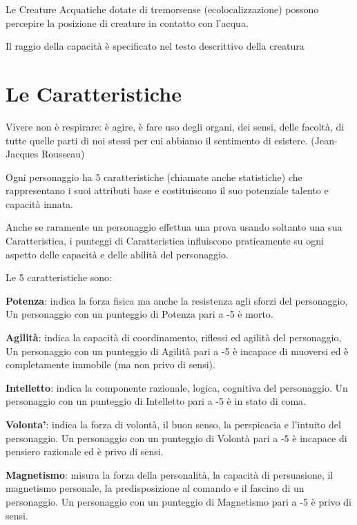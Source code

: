 \documentclass[a4paper,11pt,twoside,openany]{book}
\begin{document}
Le Creature Acquatiche dotate di tremorsense (ecolocalizzazione) possono percepire la posizione di creature in contatto con l’acqua.

Il raggio della capacità è specificato nel testo descrittivo della creatura

\pagebreak

\section{Le Caratteristiche}

\label{le-caratteristiche}

\begin{tcolorbox}[enhanced,arc=5pt,boxrule=0.3pt]{Vivere non è respirare: è agire, è fare uso degli organi, dei sensi, delle facoltà, di tutte quelle parti di noi stessi per cui abbiamo il sentimento di esistere. (Jean-Jacques Rousseau)}\end{tcolorbox}\medskip

Ogni personaggio ha 5 caratteristiche (chiamate anche statistiche) che rappresentano i suoi attributi base e costituiscono il suo potenziale talento e capacità innata.

Anche se raramente un personaggio effettua una prova usando soltanto una sua Caratteristica, i punteggi di Caratteristica influiscono praticamente su ogni aspetto delle capacità e delle abilità del personaggio.

Le 5 caratteristiche sono:

\textbf{Potenza}: indica la forza fisica ma anche la resistenza agli sforzi del personaggio, Un personaggio con un punteggio di Potenza pari a -5 è morto.

\textbf{Agilità}: indica la capacità di coordinamento, riflessi ed agilità del personaggio, Un personaggio con un punteggio di Agilità pari a -5 è incapace di muoversi ed è completamente immobile (ma non privo di sensi).

\textbf{Intelletto}: indica la componente razionale, logica, cognitiva del personaggio. Un personaggio con un punteggio di Intelletto pari a -5 è in stato di coma.

\textbf{Volonta'}: indica la forza di volontà, il buon senso, la perspicacia e l'intuito del personaggio. Un personaggio con un punteggio di Volontà pari a -5 è incapace di pensiero razionale ed è privo di sensi.

\textbf{Magnetismo}: misura la forza della personalità, la capacità di persuasione, il magnetismo personale, la predisposizione al comando e il fascino di un personaggio. Un personaggio con un punteggio di Magnetismo pari a -5 è privo di sensi.
\end{document}
